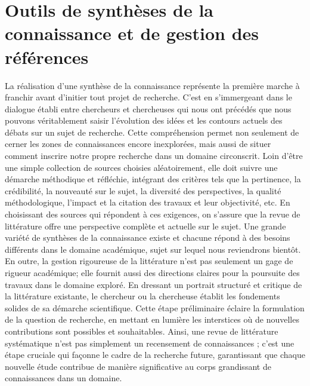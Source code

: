 \documentclass[
  letterpaper,
  DIV=11,
  numbers=noendperiod]{scrreprt}
\begin{document}

\chapter{Outils de synthèses de la connaissance et de gestion des
références}\label{sec-chap4}

La réalisation d'une synthèse de la connaissance représente la première
marche à franchir avant d'initier tout projet de recherche. C'est en
s'immergeant dans le dialogue établi entre chercheurs et chercheuses qui
nous ont précédés que nous pouvons véritablement saisir l'évolution des
idées et les contours actuels des débats sur un sujet de recherche.
Cette compréhension permet non seulement de cerner les zones de
connaissances encore inexplorées, mais aussi de situer comment inscrire
notre propre recherche dans un domaine circonscrit. Loin d'être une
simple collection de sources choisies aléatoirement, elle doit suivre
une démarche méthodique et réfléchie, intégrant des critères tels que la
pertinence, la crédibilité, la nouveauté sur le sujet, la diversité des
perspectives, la qualité méthodologique, l'impact et la citation des
travaux et leur objectivité, etc. En choisissant des sources qui
répondent à ces exigences, on s'assure que la revue de littérature offre
une perspective complète et actuelle sur le sujet. Une grande variété de
synthèses de la connaissance existe et chacune répond à des besoins
différents dans le domaine académique, sujet sur lequel nous reviendrons
bientôt. En outre, la gestion rigoureuse de la littérature n'est pas
seulement un gage de rigueur académique; elle fournit aussi des
directions claires pour la poursuite des travaux dans le domaine
exploré. En dressant un portrait structuré et critique de la littérature
existante, le chercheur ou la chercheuse établit les fondements solides
de sa démarche scientifique. Cette étape préliminaire éclaire la
formulation de la question de recherche, en mettant en lumière les
interstices où de nouvelles contributions sont possibles et
souhaitables. Ainsi, une revue de littérature systématique n'est pas
simplement un recensement de connaissances ; c'est une étape cruciale
qui façonne le cadre de la recherche future, garantissant que chaque
nouvelle étude contribue de manière significative au corps grandissant
de connaissances dans un domaine.
\end{document}
